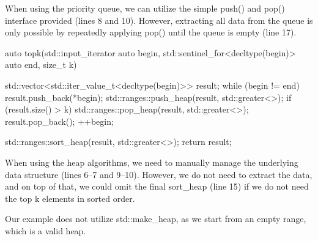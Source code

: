 When using the priority queue, we can utilize the simple push() and pop() interface provided (lines 8 and 10). However, extracting all data from the queue is only possible by repeatedly applying pop() until the queue is empty (line 17).

\begin{box-note}
\begin{cppcode}
auto topk(std::input_iterator auto begin, std::sentinel_for<decltype(begin)> auto end, 
          size_t k) {
          
    std::vector<std::iter_value_t<decltype(begin)>> result;
    while (begin != end) {
        result.push_back(*begin);
        std::ranges::push_heap(result, std::greater<>{});
        if (result.size() > k) {
            std::ranges::pop_heap(result, std::greater<>{});
            result.pop_back();
        }
        ++begin;
    }
    
    std::ranges::sort_heap(result, std::greater<>{});
    return result;    
}
\end{cppcode}
\end{box-note}

When using the heap algorithms, we need to manually manage the underlying data structure (lines 6–7 and 9–10). However, we do not need to extract the data, and on top of that, we could omit the final sort\_heap (line 15) if we do not need the top k elements in sorted order.

Our example does not utilize std::make\_heap, as we start from an empty range, which is a valid heap.

